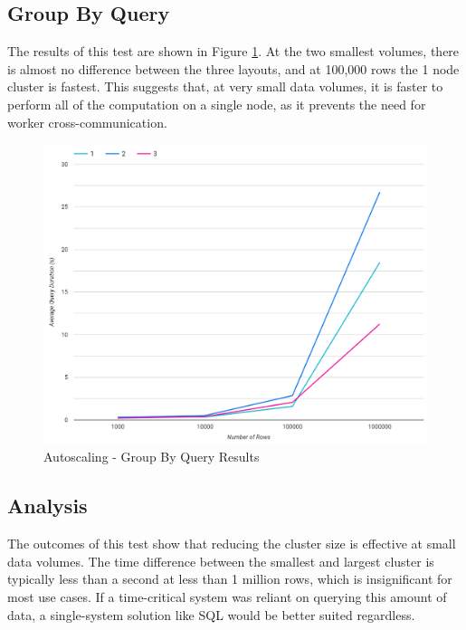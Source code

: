 \subsection{Group By Query}
The results of this test are shown in Figure \ref{fig:group-by-simple-autoscale-test}. At the two smallest volumes, there is almost no difference between the three layouts, and at 100,000 rows the 1 node cluster is fastest. This suggests that, at very small data volumes, it is faster to perform all of the computation on a single node, as it prevents the need for worker cross-communication.

\begin{figure}[ht]
	\centering
	\includegraphics[width=0.8\linewidth]{chapters/diagrams/testing/group-by-simple-autoscale-test}
	\caption{Autoscaling - Group By Query Results}
	\label{fig:group-by-simple-autoscale-test}
\end{figure}

\subsection{Analysis}
The outcomes of this test show that reducing the cluster size is effective at small data volumes. The time difference between the smallest and largest cluster is typically less than a second at less than 1 million rows, which is insignificant for most use cases. If a time-critical system was reliant on querying this amount of data, a single-system solution like SQL would be better suited regardless.
